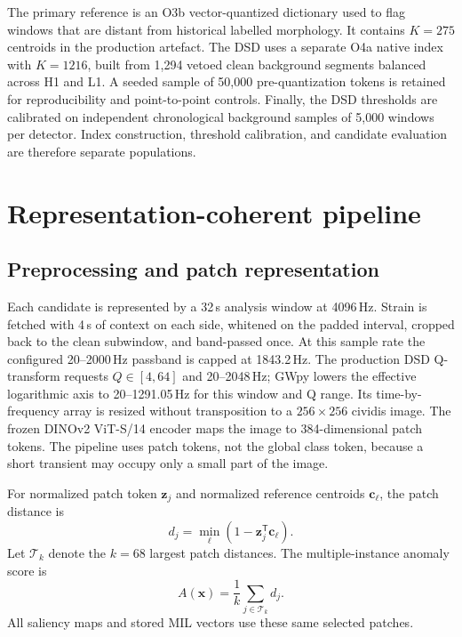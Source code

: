 \documentclass[aps,prd,twocolumn,superscriptaddress,nofootinbib,amsmath,amssymb,floatfix,10pt]{revtex4-2}
\begin{document}
The primary reference is an O3b vector-quantized dictionary used to flag
windows that are distant from historical labelled morphology.  It contains
$K=275$ centroids in the production artefact.  The DSD uses a separate O4a
native index with $K=1216$, built from 1,294 vetoed clean background segments
balanced across H1 and L1.  A seeded sample of 50,000 pre-quantization tokens
is retained for reproducibility and point-to-point controls.  Finally, the DSD
thresholds are calibrated on independent chronological background samples of
5,000 windows per detector.  Index construction, threshold calibration, and
candidate evaluation are therefore separate populations.

\section{Representation-coherent pipeline}
\label{sec:methods}

\subsection{Preprocessing and patch representation}

Each candidate is represented by a 32\,s analysis window at 4096\,Hz.  Strain is fetched
with 4\,s of context on each side, whitened on the padded interval, cropped back
to the clean subwindow, and band-passed once.  At this sample rate the configured
20--2000\,Hz passband is capped at 1843.2\,Hz.  The production DSD Q-transform
requests $Q\in[4,64]$ and 20--2048\,Hz; GWpy lowers the effective logarithmic
axis to 20--1291.05\,Hz for this window and Q range.  Its time-by-frequency
array is resized without transposition to a $256\times256$ cividis image.  The
frozen DINOv2 ViT-S/14 encoder maps the image
to 384-dimensional patch tokens.  The pipeline uses patch tokens, not the
global class token, because a short transient may occupy only a small part of
the image.

For normalized patch token $\mathbf z_j$ and normalized reference centroids
$\mathbf c_\ell$, the patch distance is
\begin{equation}
 d_j = \min_\ell \left(1-\mathbf z_j^\mathsf{T}\mathbf c_\ell\right).
\end{equation}
Let $\mathcal T_k$ denote the $k=68$ largest patch distances.  The
multiple-instance anomaly score is
\begin{equation}
 A(\mathbf x)=\frac{1}{k}\sum_{j\in\mathcal T_k}d_j .
\label{eq:mil}
\end{equation}
All saliency maps and stored MIL vectors use these same selected patches.
\end{document}
